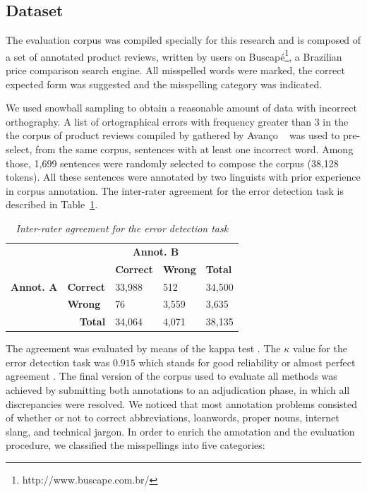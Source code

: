 \subsection{Dataset}\label{sec:dataset}

The evaluation corpus was compiled specially for this research and is composed of a set of  annotated product reviews, written by users on Buscap\'e\footnote{http://www.buscape.com.br/}, a Brazilian price comparison search engine. All misspelled words were marked, the correct expected form was suggested and the misspelling category was indicated.

We used snowball sampling to obtain a reasonable amount of data with incorrect orthography. A  list of ortographical errors with frequency greater than 3 in the  the corpus of product reviews compiled by \cite{Hartmann2014}
gathered by Avan\c{c}o ~\cite{Avanco2014} 
was used to pre-select, from the same corpus, sentences with at least
one incorrect word. Among those, 1,699 sentences were randomly
selected to compose the corpus (38,128 tokens). All these sentences
were annotated by two linguists with prior experience in corpus annotation. The inter-rater agreement for the error detection task is described in Table~\ref{tab:kappa}.

\begin{table}[ht!]
\centering
\caption{\it Inter-rater agreement for the error detection task}
\begin{tabular}{|lllll|}
\hline
 &  & \multicolumn{ 2}{c}{\textbf{Annot. B}} &  \\ \cline{3-4}
 &  & \textbf{Correct} & \textbf{Wrong} & \textbf{Total} \\ \hline
\textbf{Annot. A} & \textbf{Correct} & 33,988 & 512 & 34,500 \\
 & \textbf{Wrong} & 76 & 3,559 & 3,635 \\ \hline
\multicolumn{ 2}{|r}{\textbf{Total}}  & 34,064 & 4,071 & 38,135 \\ \hline
\end{tabular}
\label{tab:kappa}
\end{table}

The agreement was evaluated by means of the kappa test \cite{Carletta1996}. The $\kappa$
value for the error detection task was $0.915$ which stands for good reliability or almost perfect 
agreement \cite{Landis1977}. The final version of the corpus used 
to evaluate all methods was achieved by submitting both annotations to an adjudication
phase, in which all discrepancies were resolved. We noticed that most annotation 
problems consisted of whether or not to correct abbreviations, loanwords, proper nouns, internet slang, and technical jargon. In order to enrich the annotation and the evaluation procedure, we classified the misspellings into five categories:

